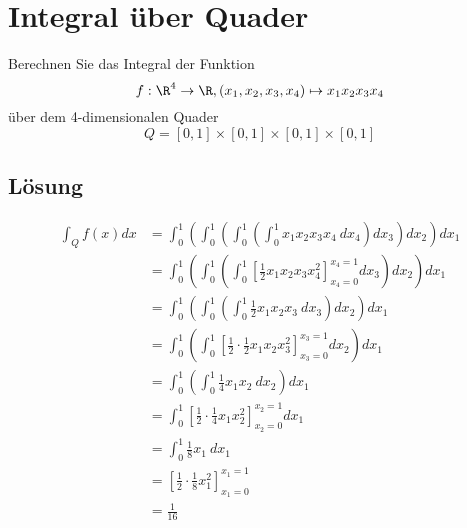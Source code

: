 \section{Integral über Quader}
Berechnen Sie das Integral der Funktion
$$
f:\R^4 \to \R, (x_1,x_2,x_3,x_4) \mapsto x_1x_2x_3x_4
$$
über dem 4-dimensionalen Quader
$$
Q=[0,1]\times[0,1]\times[0,1]\times[0,1]
$$


\subsection*{Lösung}
\begin{align*}
\int_Q f(x)dx&=\int_0^1 \left(\int_0^1 \left(\int_0^1 \left(\int_0^1 x_1x_2x_3x_4 \ d{x_4} \right)d{x_3} \right)d{x_2} \right)d{x_1} \\
&=\int_0^1 \left(\int_0^1 \left(\int_0^1 \left[ \frac{1}{2} x_1x_2x_3x_4^2\right]_{x_4=0}^{x_4=1}d{x_3} \right)d{x_2} \right)d{x_1} \\
&=\int_0^1 \left(\int_0^1 \left(\int_0^1\frac{1}{2} x_1x_2x_3 \ dx_3\right)d{x_2} \right)d{x_1} \\
&=\int_0^1 \left(\int_0^1 \left[ \frac{1}{2}\cdot\frac{1}{2} x_1x_2x_3^2\right]_{x_3=0}^{x_3=1} d{x_2} \right)d{x_1} \\
&=\int_0^1 \left(\int_0^1 \frac{1}{4} x_1x_2 \ d{x_2} \right)d{x_1} \\
&=\int_0^1 \left[ \frac{1}{2}\cdot\frac{1}{4} x_1x_2^2\right]_{x_2=0}^{x_2=1} d{x_1} \\
&=\int_0^1 \frac{1}{8} x_1 \ d{x_1} \\
&= \left[ \frac{1}{2}\cdot\frac{1}{8} x_1^2\right]_{x_1=0}^{x_1=1} \\
&= \frac{1}{16}
\end{align*}

